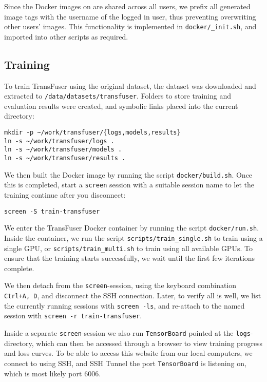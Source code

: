 Since the Docker images on \nap are shared across all users,
we prefix all generated image tags with the username of the logged in user,
thus preventing overwriting other users' images.
This functionality is implemented in \texttt{docker/\_init.sh},
and imported into other scripts as required.

\subsection{Training}

To train TransFuser using the original dataset,
the dataset was downloaded and extracted to
\texttt{/data/datasets/transfuser}.
Folders to store training and evaluation results were created,
and symbolic links placed into the current directory:
\begin{lstlisting}
mkdir -p ~/work/transfuser/{logs,models,results}
ln -s ~/work/transfuser/logs .
ln -s ~/work/transfuser/models .
ln -s ~/work/transfuser/results .
\end{lstlisting}

We then built the Docker image by running the script \texttt{docker/build.sh}.
Once this is completed,
start a \texttt{screen} session with a suitable session name
to let the training continue after you disconnect:
\begin{lstlisting}
screen -S train-transfuser
\end{lstlisting}

We enter the TransFuser Docker container by running the script \texttt{docker/run.sh}.
Inside the container,
we run the script \texttt{scripts/train\_single.sh} to train using a single GPU,
or \texttt{scripts/train\_multi.sh} to train using all available GPUs.
To ensure that the training starts successfully,
we wait until the first few iterations complete.

We then detach from the \texttt{screen}-session,
using the keyboard combination \texttt{Ctrl+A, D},
and disconnect the SSH connection.
Later, to verify all is well,
we list the currently running sessions with \texttt{screen -ls},
and re-attach to the named session with \texttt{screen -r train-transfuser}.

Inside a separate \texttt{screen}-session
we also run \texttt{TensorBoard} pointed at the \texttt{logs}-directory,
which can then be accessed through a browser to view training progress and loss curves.
To be able to access this website from our local computers,
we connect to \nap using SSH,
and SSH Tunnel the port \texttt{TensorBoard} is listening on,
which is most likely port 6006.

